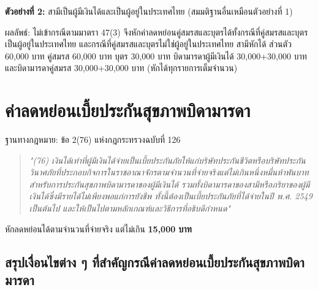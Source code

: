 \documentclass[12pt,a4paper]{article}
\newcommand{\hilight}[1]{\textbf{#1}}
\begin{document}
\textbf{ตัวอย่างที่ 2:} สามีเป็นผู้มีเงินได้และเป็นผู้อยู่ในประเทศไทย (สมมติฐานอื่นเหมือนตัวอย่างที่ 1)

ผลลัพธ์: ไม่เข้ากรณีตามมาตรา 47(3) จึงหักค่าลดหย่อนคู่สมรสและบุตรได้ทั้งกรณีที่คู่สมรสและบุตรเป็นผู้อยู่ในประเทศไทย และกรณีที่คู่สมรสและบุตรไม่ใช่ผู้อยู่ในประเทศไทย สามีหักได้ ส่วนตัว 60,000 บาท คู่สมรส 60,000 บาท บุตร 30,000 บาท บิดามารดาผู้มีเงินได้ 30,000+30,000 บาท และบิดามารดาคู่สมรส 30,000+30,000 บาท (หักได้ทุกรายการเต็มจำนวน)

\newpage
\section{ค่าลดหย่อนเบี้ยประกันสุขภาพบิดามารดา}

ฐานทางกฎหมาย: ข้อ 2(76) แห่งกฎกระทรวงฉบับที่ 126

\begin{quote}
\textit{"(76) เงินได้เท่าที่ผู้มีเงินได้จ่ายเป็นเบี้ยประกันภัยให้แก่บริษัทประกันชีวิตหรือบริษัทประกันวินาศภัยที่ประกอบกิจการในราชอาณาจักรตามจำนวนที่จ่ายจริงแต่ไม่เกินหนึ่งหมื่นห้าพันบาท สำหรับการประกันสุขภาพบิดามารดาของผู้มีเงินได้ รวมทั้งบิดามารดาของสามีหรือภริยาของผู้มีเงินได้ซึ่งมีรายได้ไม่เพียงพอแก่การยังชีพ ทั้งนี้ต้องเป็นเบี้ยประกันภัยที่ได้จ่ายในปี พ.ศ. 2549 เป็นต้นไป และให้เป็นไปตามหลักเกณฑ์และวิธีการที่อธิบดีกำหนด"}
\end{quote}

หักลดหย่อนได้ตามจำนวนที่จ่ายจริง แต่ไม่เกิน \hilight{15,000 บาท}

\subsection*{สรุปเงื่อนไขต่าง ๆ ที่สำคัญกรณีค่าลดหย่อนเบี้ยประกันสุขภาพบิดามารดา}
\end{document}
